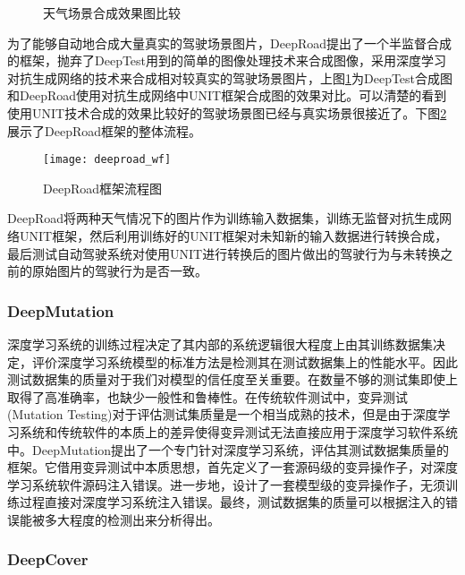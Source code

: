 \begin{figure}[h]
    \centering
    \caption{天气场景合成效果图比较}
    \label{label-deeptest}
\end{figure}

为了能够自动地合成大量真实的驾驶场景图片，DeepRoad提出了一个半监督合成的框架，抛弃了DeepTest用到的简单的图像处理技术来合成图像，采用深度学习对抗生成网络的技术来合成相对较真实的驾驶场景图片，上图\ref{label-deeptest}为DeepTest合成图和DeepRoad使用对抗生成网络中UNIT\cite{UNIT}框架合成图的效果对比。可以清楚的看到使用UNIT技术合成的效果比较好的驾驶场景图已经与真实场景很接近了。下图\ref{deeproad_wf}展示了DeepRoad框架的整体流程。 

\begin{figure}[h]
    \centering
    \texttt{[image: deeproad\_wf]}
    \caption{DeepRoad框架流程图\cite{DeepRoad}}
    \label{deeproad_wf}
\end{figure}

DeepRoad将两种天气情况下的图片作为训练输入数据集，训练无监督对抗生成网络UNIT\cite{UNIT}框架，然后利用训练好的UNIT框架对未知新的输入数据进行转换合成，最后测试自动驾驶系统对使用UNIT进行转换后的图片做出的驾驶行为与未转换之前的原始图片的驾驶行为是否一致。

\subsubsection{DeepMutation}

深度学习系统的训练过程决定了其内部的系统逻辑很大程度上由其训练数据集决定，评价深度学习系统模型的标准方法是检测其在测试数据集上的性能水平。因此测试数据集的质量对于我们对模型的信任度至关重要。在数量不够的测试集即使上取得了高准确率，也缺少一般性和鲁棒性。在传统软件测试中，变异测试(Mutation Testing)对于评估测试集质量是一个相当成熟的技术，但是由于深度学习系统和传统软件的本质上的差异使得变异测试无法直接应用于深度学习软件系统中。DeepMutation提出了一个专门针对深度学习系统，评估其测试数据集质量的框架。它借用变异测试中本质思想，首先定义了一套源码级的变异操作子，对深度学习系统软件源码注入错误。进一步地，设计了一套模型级的变异操作子，无须训练过程直接对深度学习系统注入错误。最终，测试数据集的质量可以根据注入的错误能被多大程度的检测出来分析得出。

\subsubsection{DeepCover}

